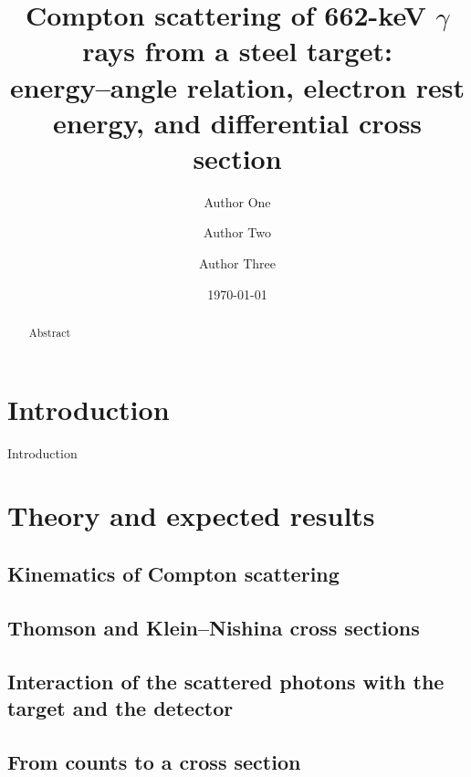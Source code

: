 \documentclass[aps,pra,reprint,superscriptaddress,nofootinbib,floatfix]{revtex4-2}
\begin{document}
\title{Compton scattering of 662-keV $\gamma$ rays from a steel target:\\
energy--angle relation, electron rest energy, and differential cross section}

\author{Author One}
\author{Author Two}
\author{Author Three}
\date{\today}

\begin{abstract}
Abstract
\end{abstract}

\maketitle

\section{Introduction}
\label{sec:intro}

Introduction

\section{Theory and expected results}
\label{sec:theory}

\subsection{Kinematics of Compton scattering}


\subsection{Thomson and Klein--Nishina cross sections}


\subsection{Interaction of the scattered photons with the target and the detector}


\subsection{From counts to a cross section}
\label{sec:measeq}
\end{document}

